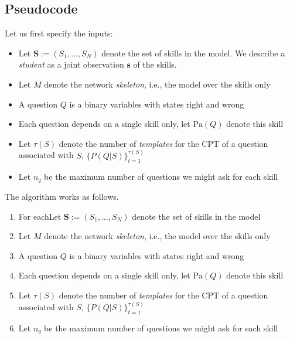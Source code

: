 \documentclass[runningheads]{llncs}
\begin{document}
	\subsection*{Pseudocode}
	Let us first specify the inputs:
	\begin{itemize}
		\item Let $\bm{S}:=(S_1,\ldots,S_N)$ denote the set of skills in the model. We 
		describe a \emph{student} as a joint observation $\bm{s}$ of the skills.
		\item Let $M$ denote the network \emph{skeleton}, i.e., the model over the skills only
		\item A question $Q$ is a binary variables with states right and wrong
		\item Each question depends on a single skill only, let $\mathrm{Pa}(Q)$ denote this 
		skill
		\item Let $\tau(S)$ denote the number of \emph{templates} for the CPT of a question 
		associated with $S$, $\{P(Q|S)\}_{t=1}^{\tau(S)}$ 
		\item Let $n_q$ be the maximum number of questions we might ask for each skill
	\end{itemize}
	The algorithm works as follows.
	\begin{enumerate}
		\item For eachLet $\bm{S}:=(S_1,\ldots,S_N)$ denote the set of skills in the model
		\item Let $M$ denote the network \emph{skeleton}, i.e., the model over the skills only
		\item A question $Q$ is a binary variables with states right and wrong
		\item Each question depends on a single skill only, let $\mathrm{Pa}(Q)$ denote this 
		skill
		\item Let $\tau(S)$ denote the number of \emph{templates} for the CPT of a question 
		associated with $S$, $\{P(Q|S)\}_{t=1}^{\tau(S)}$ 
		\item Let $n_q$ be the maximum number of questions we might ask for each skill
	\end{enumerate}
	
\end{document}
